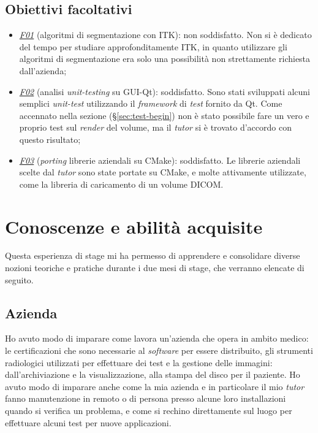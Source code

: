 \subsection{Obiettivi facoltativi}
\begin{itemize}
	 \item \underline{\textit{F01}} (algoritmi di segmentazione con ITK): non soddisfatto. Non si è dedicato del tempo per studiare approfonditamente ITK, in quanto utilizzare gli algoritmi di segmentazione era solo una possibilità non strettamente richiesta dall'azienda;
	 \item \underline{\textit{F02}} (analisi \emph{unit-testing} su GUI-Qt): soddisfatto. Sono stati sviluppati alcuni semplici \emph{unit-test} utilizzando il \emph{framework} di \emph{test} fornito da Qt. Come accennato nella sezione  (§\ref{sec:test-begin}) non è stato possibile fare un vero e proprio test sul \emph{render} del volume, ma il \emph{tutor} si è trovato d'accordo con questo risultato;
	 \item \underline{\textit{F03}} (\emph{porting} librerie aziendali su CMake): soddisfatto. Le librerie aziendali scelte dal \emph{tutor} sono state portate su CMake, e molte attivamente utilizzate, come la libreria di caricamento di un volume DICOM.
\end{itemize}

\section{Conoscenze e abilità acquisite}
Questa esperienza di stage mi ha permesso di apprendere e consolidare diverse nozioni teoriche e pratiche durante i due mesi di stage, che verranno elencate di seguito.

\subsection{Azienda}
Ho avuto modo di imparare come lavora un'azienda che opera in ambito medico: le certificazioni che sono necessarie al \emph{software} per essere distribuito, gli strumenti radiologici utilizzati per effettuare dei test e la gestione delle immagini: dall'archiviazione e la visualizzazione, alla stampa del disco per il paziente. Ho avuto modo di imparare anche come la mia azienda e in particolare il mio \emph{tutor} fanno manutenzione in remoto o di persona presso alcune loro installazioni quando si verifica un problema, e come si rechino direttamente sul luogo per effettuare alcuni test per nuove applicazioni.

